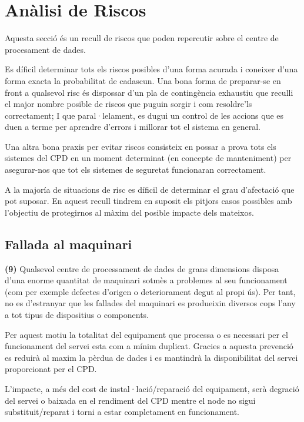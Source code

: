 \section{Anàlisi de Riscos}

Aquesta secció és un recull de riscos que poden repercutir sobre el centre de procesament de dades.

Es díficil determinar tots els riscos posibles d'una forma acurada i coneixer d'una forma exacta la probabilitat de cadascun. Una bona forma de preparar-se en front a qualsevol risc és dispossar d'un pla de contingència exhaustiu que reculli el major nombre posible de riscos que puguin sorgir i com resoldre'ls correctament; I que paral·lelament, es dugui un control de les accions que es duen a terme per aprendre d'errors i millorar tot el sistema en general. 

Una altra bona praxis per evitar riscos consisteix en possar a prova tots els sistemes del CPD en un moment determinat (en concepte de manteniment) per asegurar-nos que tot els sistemes de seguretat funcionaran correctament.

A la majoría de situacions de risc es díficil de determinar el grau d'afectació que pot suposar. En aquest recull tindrem en suposit els pitjors casos possibles amb l'objectiu de protegirnos al màxim del posible impacte dels mateixos.

\subsection{Fallada al maquinari}

\textbf{(9)} Qualsevol centre de processament de dades de grans dimensions disposa d'una enorme quantitat de maquinari sotmès a problemes al seu funcionament (com per exemple defectes d'origen o deteriorament degut al propi ús). Per tant, no es d'estranyar que les fallades del maquinari es produeixin diversos cops l'any a tot tipus de dispositius o components.

Per aquest motiu la totalitat del equipament que processa o es necessari per el funcionament del servei esta com a mínim duplicat. Gracies a aquesta prevenció es reduirà al maxim la pèrdua de dades i es mantindrà la disponibilitat del servei proporcionat per el CPD. 

L'impacte, a més del cost de instal·lació/reparació del equipament, serà degració del servei o baixada en el rendiment del CPD mentre el node no sigui substituit/reparat i torni a estar completament en funcionament.

